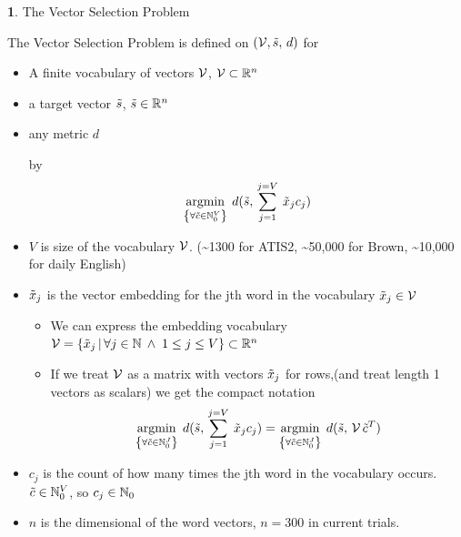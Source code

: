 \documentclass[]{scrartcl}
\numberwithin{equation}{section}
\numberwithin{figure}{section}
\theoremstyle{plain}
\theoremstyle{definition}
\newtheorem{defn}[thm]{\protect\definitionname}
\providecommand{\definitionname}{Definition}
\DeclareMathOperator*{\argmin}{argmin}
\begin{document}
\begin{defn} {The Vector Selection Problem}
	

	The Vector Selection Problem is defined on $(\mathcal{V}, \tilde{s},\,d)$ for
	\begin{itemize}
		\item A finite vocabulary of vectors $\mathcal{V}$, $\mathcal{V}\subset{\mathbb{R}}^{n}$
		\item a target vector $ \tilde{s}$, $ \tilde{s}\in\mathbb{R}^{n}$
		\item any metric $d$ 
		
		by
		\[
		\argmin_{\left\{ \forall\tilde{c}\in\N_{0}^{V}\right\} }\:d( \s,\,\sum_{j=1}^{j=V}\:\x_{j}c_{j})
		\]
		
		\medskip{}
				
		\item $V$ is size of the vocabulary $\mathcal{V}$. (\textasciitilde{}1300
		for ATIS2, \textasciitilde{}50,000 for Brown, \textasciitilde{}10,000
		for daily English) 
		\item $\tilde{x}_{j}$ is the vector embedding for the jth word in the vocabulary
		$\tilde{x}_{j}\in\mathcal{V}$ 
		
		\begin{itemize}
			\item We can express the embedding vocabulary $\mathcal{V}=\{\tilde{x}_{j}\,|\,\forall j\in\mathbb{N}\:\wedge\;1\le j\le V\}\subset\mathbb{R}^{n}$
			\item If we treat $\mathcal{V}$ as a matrix with vectors $\tilde{x}_{j}$
			for rows,(and treat length 1 vectors as scalars) we get the compact
			notation 
			\[
			\argmin_{\left\{ \forall\tilde{c}\in\N_{0}^{J}\right\} }\:d(\s,\,\sum_{j=1}^{j=V}\:\x_{j}c_{j})=\argmin_{\left\{ \forall\tilde{c}\in\N_{0}^{J}\right\} }\:d(\s,\,\V\,\c^{T})
			\]
			
		\end{itemize}
		\item $c_{j}$ is the count of how many times the jth word in the vocabulary
		occurs. $\tilde{c}\in\mathbb{N}_{0}^{V}$, so $c_{j}\in\mathbb{N}_{0}$
		\item $n$ is the dimensional of the word vectors, $n=300$ in current trials. \end{itemize}
\end{defn}
\end{document}
